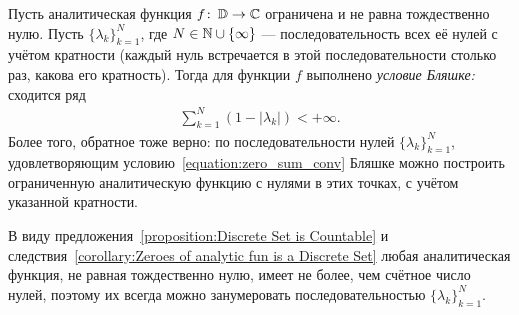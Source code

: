 \documentclass[../complex-analysis.tex]{subfiles}
\begin{document}
\begin{thm}
 Пусть аналитическая функция $ f\colon\,\mathbb D \to \mathbb{C} $  ограничена и не равна тождественно нулю. Пусть $\{\lambda_{k}\}_{k=1}^{N} $,  где $ N \in \mathbb{N} \cup \left\{ \infty \right\} $ --- последовательность всех её нулей с учётом кратности (каждый нуль встречается в этой последовательности столько раз, какова его кратность). Тогда для функции $ f $ выполнено \emph{условие Бляшке:} сходится ряд
 \begin{align}
  \label{equation:zero_sum_conv}
  \sum_{k=1}^{N} \left( 1 - \left| \lambda_k \right| \right) < +\infty.
 \end{align} Более того, обратное тоже верно: по последовательности нулей $ \{\lambda_{k}\}_{k=1}^{N}  $, удовлетворяющим условию~\eqref{equation:zero_sum_conv} Бляшке можно построить ограниченную аналитическую функцию с нулями в этих точках, с учётом указанной кратности.
\end{thm}

В виду предложения~\ref{proposition:Discrete Set is Countable} и следствия~\ref{corollary:Zeroes of analytic fun is a Discrete Set} любая аналитическая функция, не равная тождественно нулю, имеет не более, чем счётное число нулей, поэтому их всегда можно занумеровать последовательностью $ \{\lambda_{k}\}_{k=1}^{N}  $.
\end{document}
